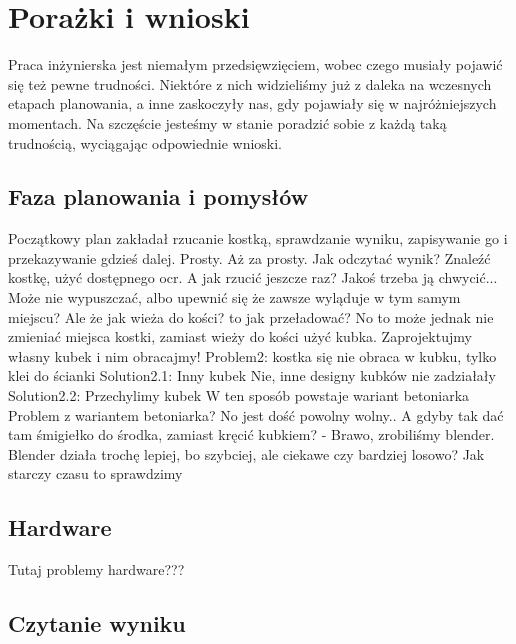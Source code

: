\usepackage[utf8]{inputenc}
\usepackage[T1]{fontenc}
\usepackage{blindtext}

\chapter{Porażki i wnioski}\label{ch:porazki-i-wnioski}
Praca inżynierska jest niemałym przedsięwzięciem, wobec czego musiały pojawić się też pewne trudności.
Niektóre z nich widzieliśmy już z daleka na wczesnych etapach planowania, a inne zaskoczyły nas, gdy pojawiały się w najróżniejszych momentach.
Na szczęście jesteśmy w stanie poradzić sobie z każdą taką trudnością, wyciągając odpowiednie wnioski. \n


\section{Faza planowania i pomysłów}\label{sec:faza-planowania-i-pomysow}

Początkowy plan zakładał rzucanie kostką, sprawdzanie wyniku, zapisywanie go i przekazywanie gdzieś dalej.
Prosty.
Aż za prosty.
Jak odczytać wynik?
Znaleźć kostkę, użyć dostępnego ocr.
A jak rzucić jeszcze raz?
Jakoś trzeba ją chwycić...
Może nie wypuszczać, albo upewnić się że zawsze wyląduje w tym samym miejscu?
Ale że jak wieża do kości? to jak przeładować?
No to może jednak nie zmieniać miejsca kostki, zamiast wieży do kości użyć kubka.
Zaprojektujmy własny kubek i nim obracajmy!
Problem2: kostka się nie obraca w kubku, tylko klei do ścianki
Solution2.1: Inny kubek
Nie, inne designy kubków nie zadziałały
Solution2.2: Przechylimy kubek
W ten sposób powstaje wariant betoniarka
Problem z wariantem betoniarka?
No jest dość powolny wolny..
A gdyby tak dać tam śmigiełko do środka, zamiast kręcić kubkiem?
- Brawo, zrobiliśmy blender.
Blender działa trochę lepiej, bo szybciej, ale ciekawe czy bardziej losowo?
Jak starczy czasu to sprawdzimy


\section{Hardware}\label{sec:hardware}

Tutaj problemy hardware???


\section{Czytanie wyniku}\label{sec:czytanie-wyniku}

